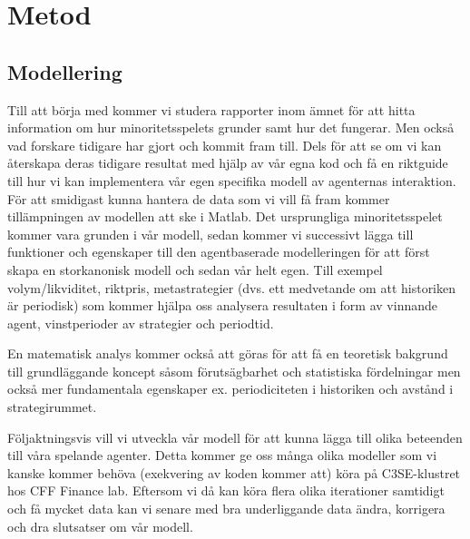 \section{Metod}


\subsection{Modellering}
Till att börja med kommer vi studera rapporter inom ämnet för att hitta information om hur minoritetsspelets grunder samt hur det fungerar. Men också vad forskare tidigare har gjort och kommit fram till. Dels för att se om vi kan återskapa deras tidigare resultat med hjälp av vår egna kod och få en riktguide till hur vi kan implementera vår egen specifika modell av agenternas interaktion. För att smidigast kunna hantera de data som vi vill få fram kommer tillämpningen av modellen att ske i Matlab. Det ursprungliga minoritetsspelet kommer vara grunden i vår modell, sedan kommer vi successivt lägga till funktioner och egenskaper till den agentbaserade modelleringen för att först skapa en storkanonisk modell och sedan vår helt egen. Till exempel volym/likviditet, riktpris, metastrategier (dvs. ett medvetande om att historiken är periodisk) som kommer hjälpa oss analysera resultaten i form av vinnande agent, vinstperioder av strategier och periodtid.

En matematisk analys kommer också att göras för att få en teoretisk bakgrund till grundläggande koncept såsom förutsägbarhet och statistiska fördelningar men också mer fundamentala egenskaper ex. periodiciteten i historiken och avstånd i strategirummet. 

Följaktningsvis vill vi utveckla vår modell för att kunna lägga till olika beteenden till våra spelande agenter. Detta kommer ge oss många olika modeller som vi kanske kommer behöva (exekvering av koden kommer att) köra på C3SE-klustret hos CFF Finance lab. Eftersom vi då kan köra flera olika iterationer samtidigt och få mycket data kan vi senare med bra underliggande data ändra, korrigera och dra slutsatser om vår modell.

